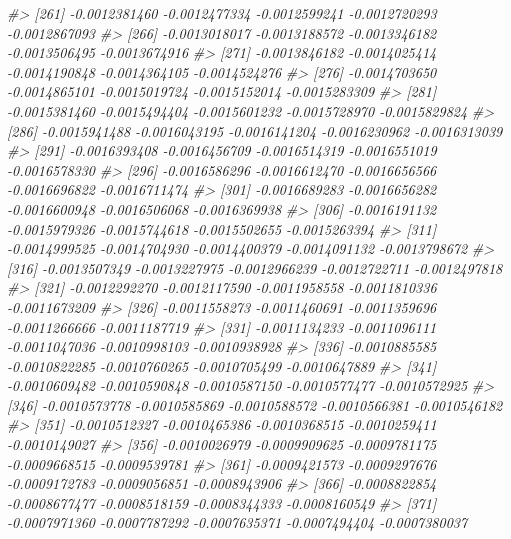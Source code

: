 \documentclass[
]{article}
\newenvironment{Shaded}{\begin{snugshade}}{\end{snugshade}}
\newcommand{\CommentTok}[1]{\textcolor[rgb]{0.56,0.35,0.01}{\textit{#1}}}
\begin{document}
\begin{Shaded}
\begin{Highlighting}[]
\CommentTok{\#\textgreater{} [261] {-}0.0012381460 {-}0.0012477334 {-}0.0012599241 {-}0.0012720293 {-}0.0012867093}
\CommentTok{\#\textgreater{} [266] {-}0.0013018017 {-}0.0013188572 {-}0.0013346182 {-}0.0013506495 {-}0.0013674916}
\CommentTok{\#\textgreater{} [271] {-}0.0013846182 {-}0.0014025414 {-}0.0014190848 {-}0.0014364105 {-}0.0014524276}
\CommentTok{\#\textgreater{} [276] {-}0.0014703650 {-}0.0014865101 {-}0.0015019724 {-}0.0015152014 {-}0.0015283309}
\CommentTok{\#\textgreater{} [281] {-}0.0015381460 {-}0.0015494404 {-}0.0015601232 {-}0.0015728970 {-}0.0015829824}
\CommentTok{\#\textgreater{} [286] {-}0.0015941488 {-}0.0016043195 {-}0.0016141204 {-}0.0016230962 {-}0.0016313039}
\CommentTok{\#\textgreater{} [291] {-}0.0016393408 {-}0.0016456709 {-}0.0016514319 {-}0.0016551019 {-}0.0016578330}
\CommentTok{\#\textgreater{} [296] {-}0.0016586296 {-}0.0016612470 {-}0.0016656566 {-}0.0016696822 {-}0.0016711474}
\CommentTok{\#\textgreater{} [301] {-}0.0016689283 {-}0.0016656282 {-}0.0016600948 {-}0.0016506068 {-}0.0016369938}
\CommentTok{\#\textgreater{} [306] {-}0.0016191132 {-}0.0015979326 {-}0.0015744618 {-}0.0015502655 {-}0.0015263394}
\CommentTok{\#\textgreater{} [311] {-}0.0014999525 {-}0.0014704930 {-}0.0014400379 {-}0.0014091132 {-}0.0013798672}
\CommentTok{\#\textgreater{} [316] {-}0.0013507349 {-}0.0013227975 {-}0.0012966239 {-}0.0012722711 {-}0.0012497818}
\CommentTok{\#\textgreater{} [321] {-}0.0012292270 {-}0.0012117590 {-}0.0011958558 {-}0.0011810336 {-}0.0011673209}
\CommentTok{\#\textgreater{} [326] {-}0.0011558273 {-}0.0011460691 {-}0.0011359696 {-}0.0011266666 {-}0.0011187719}
\CommentTok{\#\textgreater{} [331] {-}0.0011134233 {-}0.0011096111 {-}0.0011047036 {-}0.0010998103 {-}0.0010938928}
\CommentTok{\#\textgreater{} [336] {-}0.0010885585 {-}0.0010822285 {-}0.0010760265 {-}0.0010705499 {-}0.0010647889}
\CommentTok{\#\textgreater{} [341] {-}0.0010609482 {-}0.0010590848 {-}0.0010587150 {-}0.0010577477 {-}0.0010572925}
\CommentTok{\#\textgreater{} [346] {-}0.0010573778 {-}0.0010585869 {-}0.0010588572 {-}0.0010566381 {-}0.0010546182}
\CommentTok{\#\textgreater{} [351] {-}0.0010512327 {-}0.0010465386 {-}0.0010368515 {-}0.0010259411 {-}0.0010149027}
\CommentTok{\#\textgreater{} [356] {-}0.0010026979 {-}0.0009909625 {-}0.0009781175 {-}0.0009668515 {-}0.0009539781}
\CommentTok{\#\textgreater{} [361] {-}0.0009421573 {-}0.0009297676 {-}0.0009172783 {-}0.0009056851 {-}0.0008943906}
\CommentTok{\#\textgreater{} [366] {-}0.0008822854 {-}0.0008677477 {-}0.0008518159 {-}0.0008344333 {-}0.0008160549}
\CommentTok{\#\textgreater{} [371] {-}0.0007971360 {-}0.0007787292 {-}0.0007635371 {-}0.0007494404 {-}0.0007380037}

\end{Highlighting}
\end{Shaded}
\end{document}
